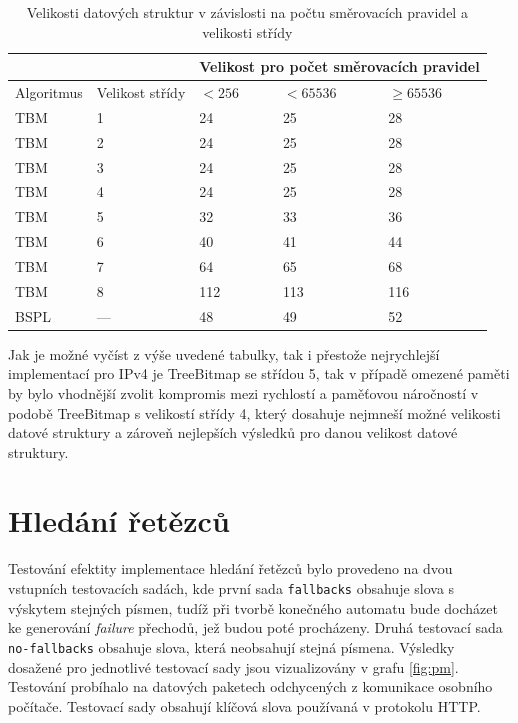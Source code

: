 \begin{table}[!htbp]
	\center
    \begin{tabular}{|l|l|l|l|l|}
    \hline
    & & \multicolumn{3}{l|}{Velikost pro počet směrovacích pravidel} \\ \hline
    Algoritmus & Velikost střídy & $< 256$ & $< 65536$ & $\geq 65536$\\ \hhline{|=|=|=|=|=|}
    TBM & 1 & 24 & 25 & 28 \\ \hline
    TBM & 2 & 24 & 25 & 28\\ \hline
    TBM & 3 & 24 & 25 & 28\\ \hline
    TBM & 4 & 24 & 25 & 28\\ \hline
    TBM & 5 & 32 & 33 & 36\\ \hline
    TBM & 6 & 40 & 41 & 44\\ \hline
    TBM & 7 & 64 & 65 & 68\\ \hline
    TBM & 8 & 112 & 113 & 116\\ \hline
    BSPL & --- & 48 & 49 & 52\\ \hline
    \end{tabular}
	\caption{Velikosti datových struktur v závislosti na počtu směrovacích pravidel a velikosti střídy}
    \label{tab:lpm-input}
\end{table}

Jak je možné vyčíst z výše uvedené tabulky, tak i přestože nejrychlejší implementací pro IPv4 je TreeBitmap se střídou 5, tak v případě omezené paměti by bylo vhodnější zvolit kompromis mezi rychlostí a paměťovou náročností v podobě
TreeBitmap s velikostí střídy 4, který dosahuje nejmneší možné velikosti datové struktury a zároveň nejlepších výsledků pro danou velikost datové struktury.

\section{Hledání řetězců} %
Testování efektity implementace hledání řetězců bylo provedeno na dvou vstupních testovacích sadách,
kde první sada \texttt{fallbacks} obsahuje slova s výskytem stejných písmen, tudíž při tvorbě konečného automatu bude
docházet ke generování \textit{failure} přechodů, jež budou poté procházeny. Druhá testovací sada \texttt{no-fallbacks}
obsahuje slova, která neobsahují stejná písmena. Výsledky dosažené pro jednotlivé testovací sady jsou
vizualizovány v grafu \ref{fig:pm}. Testování probíhalo na datových paketech odchycených z komunikace osobního počítače. Testovací sady obsahují klíčová slova používaná v protokolu HTTP.

